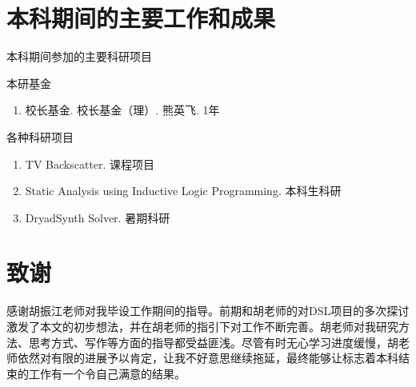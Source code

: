 \documentclass[UTF8,openany,AutoFakeBold,AutoFakeSlant,cs4size]{ctexbook}
\begin{document}
\clearpage
{}
{}
\small





\linespread{1}\selectfont
\normalsize
\chapter*{本科期间的主要工作和成果}

\noindent 本科期间参加的主要科研项目

\noindent 本研基金
\begin{enumerate}
	\item 校长基金. 校长基金（理）. 熊英飞. 1年
\end{enumerate}

\noindent 各种科研项目
\begin{enumerate}
	\item TV Backscatter. 课程项目
	\item Static Analysis using Inductive Logic Programming. 本科生科研
	\item DryadSynth Solver. 暑期科研
\end{enumerate}



{
	\fancyhf{}
	\fancyfoot[CO,CE]{~\thepage~}
	\renewcommand{\headrulewidth}{0.7pt}
	\renewcommand{\footrulewidth}{0pt}
}
\fancyhf{}
\fancyfoot[CO,CE]{~\thepage~}
\renewcommand{\headrulewidth}{0.7pt}
\renewcommand{\footrulewidth}{0pt}
\clearpage





\linespread{1.5}\selectfont
\normalsize
\chapter*{致谢}
感谢胡振江老师对我毕设工作期间的指导。前期和胡老师的对DSL项目的多次探讨激发了本文的初步想法，并在胡老师的指引下对工作不断完善。胡老师对我研究方法、思考方式、写作等方面的指导都受益匪浅。尽管有时无心学习进度缓慢，胡老师依然对有限的进展予以肯定，让我不好意思继续拖延，最终能够让标志着本科结束的工作有一个令自己满意的结果。
\end{document}

